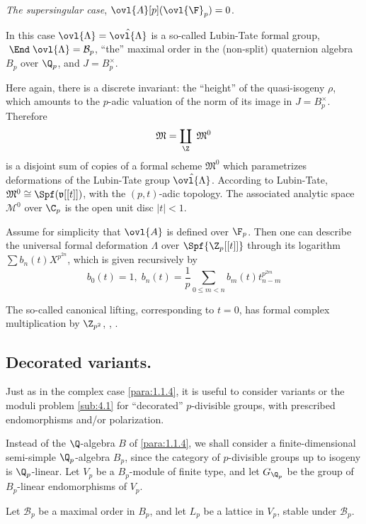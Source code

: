 \begin{para}\label{para:4.2.2} {\it The supersingular case}, \ie
 ${\ovl{A}}[p]({\ovl{\F}}_p)= 0$. 
 
 In this case ${\ovl{\Lambda}}
 =\hat{\ovl{\Lambda}}$ is a so-called Lubin-Tate formal group,
 $\;\End\;{\ovl{\Lambda}}=\mathcal{B}_p$, ``the'' maximal order in 
 the (non-split) quaternion algebra $B_p$ over ${\Q}_p$, and $J=B_p^\times$.
 
 
 Here again, there is a discrete invariant: the ``height'' of the
 quasi-isogeny $\rho$, which amounts to the 
 $p$-adic valuation of the norm of its image in $J=B_p^\times$.
 Therefore 
 \begin{equation*}
  \mathfrak{M}=\coprod_{\Z}\;\mathfrak{M}^0
 \end{equation*}
 is a disjoint sum of copies of a formal scheme $\mathfrak{M}^0$
 which parametrizes deformations of the Lubin-Tate group
 $\hat{\ovl{\Lambda}}$. According to Lubin-Tate, $\mathfrak{M}^0\cong
 \Spf(\mathfrak{v}[[t]])$, with the $(p,t)$-adic topology. The
 associated analytic space $\mathcal{M}^0$ over $\C_p$ is the open unit
 disc $|t|<1$.

 Assume for simplicity that ${\ovl{A}}$ is defined over ${\F}_p$. Then
 one can describe the universal formal deformation $\Lambda$ over
 $\Spf{\Z_p[[t]]}$ through its logarithm $\sum b_n(t)X^{p^{2n}}$, which
 is given recursively by
 \begin{equation*}
  b_0(t)=1,\;b_n(t)=\frac{1}{p}\sum_{0\leq m < n}b_m(t)t_{n-m}^{p^{2m}}
 \end{equation*} 

 
The so-called canonical lifting, corresponding to $t=0$, has formal complex
multiplication by $\Z_{p^2}$, \cf \cite{gross94:_equiv_lubin_tate}, \cite{trapmlsasht}.
\end{para}

 
\subsection{Decorated variants.}\label{sub:4.3} 

\begin{para}\label{para:4.3.1} Just as in the complex case
 \ref{para:1.1.4}, it is useful to consider variants or the moduli
 problem \ref{sub:4.1} for ``decorated'' $p$-divisible groups, with prescribed
 endomorphisms and/or polarization.


Instead of
the $\Q$-algebra $B$ of \ref{para:1.1.4}, we shall consider a finite-dimensional semi-simple $\Q_p$-algebra $B_p$, since
the category of $p$-divisible groups up to isogeny is
$\Q_p$-linear. Let $V_p$ be a $B_p$-module
of finite type, and let $G_{\Q_p}$ be the group of 
$B_p$-linear endomorphisms of $V_p$.
\par\noindent  Let $\mathcal{B}_p$ be a maximal order in $B_p$, and let
$L_p$ be a lattice in $V_p$, stable under $\mathcal{B}_p$. 


\end{para}

